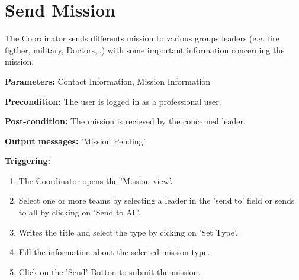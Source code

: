 \section{Send Mission}
\label{operation:SendMission}
The Coordinator sends differents mission to various groups leaders (e.g. fire
figther, military, Doctors,..) with some important information concerning the
mission.\\
\begin{description}
\item \textbf{Parameters:} Contact Information, Mission Information
\item \textbf{Precondition:} The user is logged in as a professional user.
\item \textbf{Post-condition:} The mission is recieved by the concerned leader.
\item \textbf{Output messages:} 'Mission Pending'
\item \textbf{Triggering:}
\begin{enumerate}
\item The Coordinator opens the 'Mission-view'.
\item Select one or more teams by selecting a leader in the 'send to' field or
sends to all by clicking on 'Send to All'.
\item Writes the title and select the type by cicking on 'Set Type'.
\item Fill the information about the selected mission type.
\item Click on the 'Send'-Button to submit the mission.
\end{enumerate}
\end{description} 

